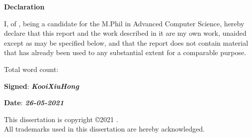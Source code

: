 \newpage
{\Huge \bf Declaration}

\vspace{24pt} 

I, \authorname of \authorcollege, being a candidate for the M.Phil in
Advanced Computer Science, hereby declare that this report and the
work described in it are my own work, unaided except as may be
specified below, and that the report does not contain material that
has already been used to any substantial extent for a comparable
purpose.

\vspace{24pt}
Total word count: \wordcount

\vspace{60pt}
\textbf{Signed}: \textbf{\textit{KooiXiuHong}}

\vspace{12pt}
\textbf{Date}: \textbf{\textit{26-05-2021}}


\vfill

This dissertation is copyright \copyright 2021 \authorname. 
\\
All trademarks used in this dissertation are hereby acknowledged.



\newpage
\vspace*{\fill}
